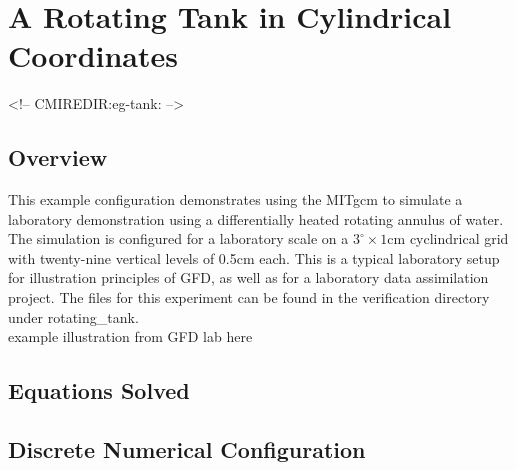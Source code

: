 

%
%

\section{A Rotating Tank in Cylindrical Coordinates}
\label{sect:eg-tank}
\label{www:tutorials}
\begin{rawhtml}
<!-- CMIREDIR:eg-tank: -->
\end{rawhtml}

\subsection{Overview}
\label{www:tutorials}
                                                                          
This example configuration demonstrates using the MITgcm to simulate a
laboratory demonstration using a differentially heated rotating
annulus of water.  The simulation is configured for a laboratory scale
on a $3^{\circ}\times1\mathrm{cm}$ cyclindrical grid with twenty-nine
vertical levels of 0.5cm each.  This is a typical laboratory setup for
illustration principles of GFD, as well as for a laboratory data
assimilation project. The files for this experiment can be found in
the verification directory under rotating\_tank.
\\

example illustration from GFD lab here
\\



 

\subsection{Equations Solved}
\label{www:tutorials}


\subsection{Discrete Numerical Configuration}
\label{www:tutorials}

